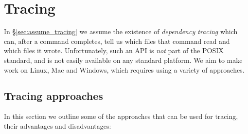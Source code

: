 \section{Tracing}
\label{sec:tracing}

In \S\ref{sec:assume_tracing} we assume the existence of \emph{dependency tracing} which can, after a command completes, tell us which files that command read and which files it wrote. Unfortunately, such an API is \emph{not} part of the POSIX standard, and is not easily available on any standard platform. We aim to make \Rattle work on Linux, Mac and Windows, which requires using a variety of approaches.

\subsection{Tracing approaches}

In this section we outline some of the approaches that can be used for tracing, their advantages and disadvantages:

